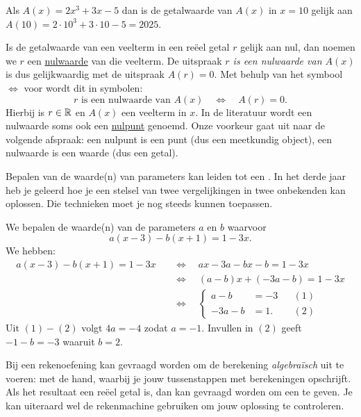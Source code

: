 \documentclass{ximera}
\begin{document}
\begin{example}
Als $A(x) = 2x^3+3x-5$ dan is de getalwaarde van $A(x)$ in $x = 10$ gelijk aan $A(10) = 2\cdot 10^3 + 3 \cdot 10 - 5 = 2025$.
\end{example}

Is de getalwaarde van een veelterm in een re\"eel getal $r$ gelijk aan nul, dan noemen we $r$ een \underline{nulwaarde}  van die veelterm. De uitspraak {\em $r$ is een nulwaarde van $A(x)$} is dus gelijkwaardig met de uitspraak {\em $A(r) = 0$}. Met behulp van het symbool $\Leftrightarrow$ voor  wordt dit in symbolen:
\[
r \text{ is een nulwaarde van } A(x) \quad \Leftrightarrow \quad A(r) = 0.
\]
Hierbij is $r \in \mathbb{R}$ en $A(x)$ een veelterm in $x$. In de literatuur wordt een nulwaarde soms ook een \underline{nulpunt} genoemd. Onze voorkeur gaat uit naar de volgende afspraak: een nulpunt is een punt (dus een meetkundig object), een nulwaarde is een waarde (dus een getal).

Bepalen van de waarde(n) van parameters kan leiden tot een . 
In het derde jaar heb je geleerd hoe je een stelsel van twee vergelijkingen in twee onbekenden kan oplossen. Die technieken moet je nog steeds kunnen toepassen. 

\begin{example}
We bepalen de waarde(n) van de parameters $a$ en $b$ waarvoor
\[
a(x-3) - b(x+1) = 1-3x.
\]
We hebben:
\begin{align*}
a(x-3) - b(x+1) = 1-3x \quad 
& \Leftrightarrow \quad ax-3a-bx-b=1-3x \\
& \Leftrightarrow \quad (a-b)x +(-3a-b) = 1-3x \\
& \Leftrightarrow \quad
\left\{
\begin{aligned}
a - b & = -3 && (1)\\
-3a - b & = 1. && (2)
\end{aligned}
\right.
\end{align*}
Uit $(1)-(2)$ volgt $4a = -4$ zodat $a = -1$. Invullen in $(2)$ geeft $-1-b =  -3$ waaruit $b = 2$. 
\end{example}

Bij een rekenoefening kan gevraagd worden om de berekening {\em algebra\"isch} uit te voeren: met de hand, waarbij je jouw tussenstappen met berekeningen opschrijft. Als het resultaat een re\"eel getal is, dan kan gevraagd worden om een  te geven. Je kan uiteraard wel de rekenmachine gebruiken om jouw oplossing te controleren. 
\end{document}
